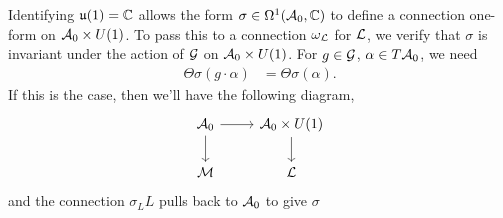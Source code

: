 	Identifying $\mathfrak{u}(1)=\mathbb{C}$ allows the form $\sigma\in \Omega^1(\mathcal{A}_0,\mathbb{C})$ to define a connection one-form on $\mathcal{A}_0 \times U(1)$. To pass this to a connection $\omega_{\mathcal{L}}$ for $\mathcal{L}$, we verify that $\sigma$ is invariant under the action of $\mathcal{G}$ on $\mathcal{A}_0 \times U(1)$. For $g\in \mathcal{G}$, $\alpha\in T\mathcal{A}_0$, we need
	\begin{align*}
	\Theta \sigma(g\cdot \alpha) &= \Theta\sigma(\alpha).
	\end{align*}
	If this is the case, then we'll have the following diagram,
	\[\begin{tikzcd}[ampersand replacement=\&]
	{\cA_0} \& {\cA_0\times U(1)} \\
	\MM \& \LL
	\arrow[from=1-1, to=1-2]
	\arrow[from=1-2, to=2-2]
	\arrow[from=1-1, to=2-1]
	\end{tikzcd}\]
	and the connection $\sigma_LL$ pulls back to $\mathcal{A}_0$ to give $\sigma$
	